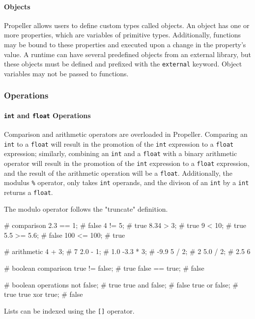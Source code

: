 \paragraph{Objects}
Propeller allows users to define custom types called objects. An object has one or
more properties, which are variables of primitive types. Additionally, functions may be bound
to these properties and executed upon a change in the property's value. A runtime can have
several predefined objects from an external library, but these objects must be defined
and prefixed with the \texttt{external} keyword. Object variables may not be passed
to functions.

\subsubsection{Operations}
\paragraph{\texttt{int} and \texttt{float} Operations}
Comparison and arithmetic operators are overloaded in Propeller. Comparing an \texttt{int} to a
\texttt{float} will result in the promotion of the \texttt{int} expression to a \texttt{float} expression;
similarly, combining an \texttt{int} and a \texttt{float} with a binary arithmetic operator will result
in the promotion of the \texttt{int} expression to a \texttt{float} expression, and the result of the
arithmetic operation will be a \texttt{float}. Additionally, the modulus \texttt{\%}
operator, only takes \texttt{int} operands, and the divison of an \texttt{int} by a \texttt{int} returns
a \texttt{float}.

The modulo operator follows the "truncate" definition.

\begin{mylisting}
# comparison
2.3 == 1;   # false
4 != 5;     # true
8.34 > 3;   # true
9 < 10;     # true
5.5 >= 5.6; # false
100 <= 100; # true

# arithmetic
4 + 3;    # 7
2.0 - 1;  # 1.0
-3.3 * 3; # -9.9
5 / 2;    # 2
5.0 / 2;  # 2.5
6 %

# boolean comparison
true != false; # true
false == true; # false

# boolean operations
not false;      # true
true and false; # false
true or false;  # true
true xor true;  # false
\end{mylisting}

\noindent Lists can be indexed using the \verb|[]| operator.

